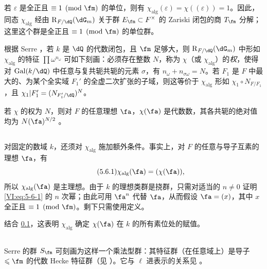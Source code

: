 \subsection{}\label{VI:5-5}

若 $\varepsilon$ 是全正且 $\equiv 1\pmod\fm$ 的单位，则有 $\chi_\text{alg}(\varepsilon) = \chi((\varepsilon)) = 1$。因此，同态 $\chi_\text{alg}$ 经由 $\res_{F/\dQ}(\dG_m)$ 关于群 $E_\fm\subset F^\times$ 的 Zariski 闭包的商 $T_\fm$ 分解；这里这个群是全正且 $\equiv 1\pmod\fm$ 的单位群。

根据 Serre \cite[II.3]{se68}，若 $k$ 是 $\dQ$ 的代数闭包，且 $\fm$ 足够大，则 $\res_{F/\dQ}(\dG_m)$ 中形如 $\chi_\text{alg}$ 的特征 $\prod \omega^{n_\omega}$ 可如下刻画：必须存在整数 $N$，称为 $\chi$（或 $\chi_\text{alg}$）的\emph{权}，使得对 $\gal(k/\dQ)$ 中任意与复共轭共轭的元素 $\sigma$，有 $n_\omega+n_{\sigma \omega}=N$。若 $F_1$ 是 $F$ 中最大的、为某个全实域 $F_1'$ 的全虚二次扩张的子域，则这等价于 $\chi_\text{alg}$ 形如 $\chi_1\circ N_{F/F_1}$，且 $\chi_1|F_1'=(N_{F_1'/\dQ})^N$。

若 $\chi$ 的权为 $N$，则对 $F$ 的任意理想 $\fa$，$\chi(\fa)$ 是代数数，其各共轭的绝对值均为 $N(\fa)^{N/2}$ \cite[II.3 prop.2]{se68}。

\subsection{}\label{VI:5-6}

对固定的数域 $k$，还须对 $\chi_\text{alg}$ 施加额外条件。事实上，对 $F$ 的任意与导子互素的理想 $\fa$，有
\begin{equation*}\tag{5.6.1}\label{VI:eq:5-6-1}
  \chi_\text{alg}(\fa) = (\chi(\fa)) \text{,}
\end{equation*}
所以 $\chi_\text{alg}(\fa)$ 是主理想。由于 $k$ 的理想类群是挠群，只需对适当的 $n\ne 0$ 证明 \eqref{VI:eq:5-6-1} 的 $n$ 次幂；由此可用 $\fa^n$ 代替 $\fa$，从而假设 $\fa=(x)$，其中 $x$ 全正且 $\equiv 1\pmod\fm$。剩下只需使用定义。

结合 \ref{VI:5-5}，这表明 $\chi_\text{alg}$ 确定 $\chi(\fa)$ 在 $k$ 的所有素位处的赋值。

\subsection{}\label{VI:5-7}

Serre 的群 $S_\fm$ 可刻画为这样一个乘法型群：其特征群（在任意域上）是导子 $\leqslant \fm$ 的代数 Hecke 特征群（见 \cite[II 2.1 et 2.2]{se68}）。它与 $\ell$ 进表示的关系见 \cite[II 2.3]{se68}。

